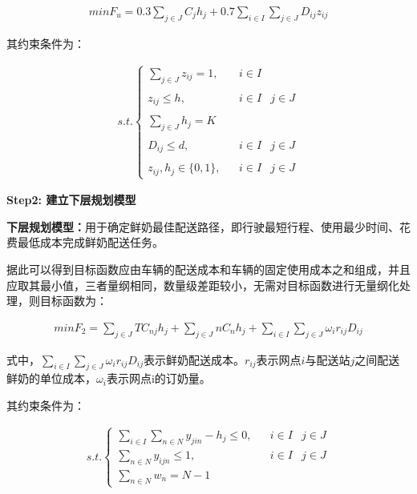 \documentclass[withoutpreface,bwprint]{cumcmthesis} %
\begin{document}
\begin{align*}
	min{{F}_{u}}=0.3\sum_{j\in J}^{}{{{C}_{j}}}{{h}_{j}}+0.7\sum_{i\in I}^{}{\sum_{j\in J}^{}{{{D}_{ij}}}}{{z}_{ij}}
\end{align*}
	
	其约束条件为：
	
\begin{align*}
	s.t.\left \{{\begin{matrix}\sum_{j\in J}^{}{{{z}_{ij}}}=1,&&i\in I&\\&&&\\{{z}_{ij}}\le h,&&i\in I&j\in J\\&&&\\\sum_{j\in J}^{}{{{h}_{j}}=K}&&&\\&&&\\{{D}_{ij}}\le d,&&i\in I&j\in J\\&&&\\{{z}_{ij}},{{h}_{j}}\in \{0,1\},&&i\in I&j\in J\end{matrix}}\right .
\end{align*}
	
\textbf{Step2: 建立下层规划模型}
	
\textbf{下层规划模型：}用于确定鲜奶最佳配送路径，即行驶最短行程、使用最少时间、花费最低成本完成鲜奶配送任务。

据此可以得到目标函数应由车辆的配送成本和车辆的固定使用成本之和组成，并且应取其最小值，三者量纲相同，数量级差距较小，无需对目标函数进行无量纲化处理，则目标函数为：

\begin{align*}
	min{{F}_{2}}=\sum_{j\in J}^{}{T{{C}_{nj}}}{{h}_{j}}+\sum_{j\in J}^{}{n{{C}_{n}}}{{h}_{j}}+\sum_{i\in I}^{}{\sum_{j\in J}^{}{{\omega _{i}}}}{{r}_{ij}}{{D}_{ij}}
\end{align*}
	
	式中，$\sum_{i\in I}^{}{\sum_{j\in J}^{}{{{ω}_{i}}}}{{r}_{ij}}{{D}_{ij}}$表示鲜奶配送成本。${{r}_{ij}}$表示网点$i$与配送站$j$之间配送鲜奶的单位成本，${{\omega }_{i}}$表示网点i的订奶量。
	
	其约束条件为：
	
	\begin{align*}
		s.t.\left \{{\begin{matrix}\sum_{i\in I}^{}{\sum_{n\in N}^{}{{{y}_{jin}}}}-{{h}_{j}}\le 0,&&i\in I&j\in J\\\sum_{n\in N}^{}{{{y}_{ijn}}}\le 1,&&i\in I&j\in J\\\sum_{n\in N}^{}{{{w}_{n}}}=N-1&&&\end{matrix}}\right.
	\end{align*}
	
\end{document}
